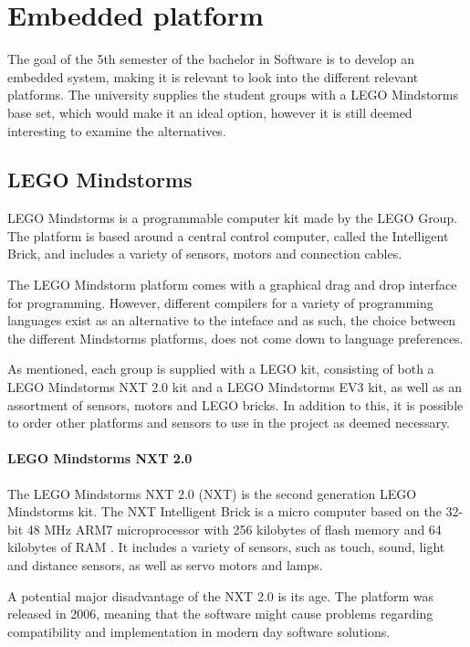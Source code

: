 

\section{Embedded platform}
The goal of the 5th semester of the bachelor in Software is to develop an embedded system, making it is relevant to look into the different relevant platforms.
The university supplies the student groups with a LEGO Mindstorms base set, which would make it an ideal option, however it is still deemed interesting to examine the alternatives.

\subsection{LEGO Mindstorms}
LEGO Mindstorms is a programmable computer kit made by the LEGO Group.
The platform is based around a central control computer, called the Intelligent Brick, and includes a variety of sensors, motors and connection cables.

The LEGO Mindstorm platform comes with a graphical drag and drop interface for programming.
However, different compilers for a variety of programming languages exist as an alternative to the inteface and as such, the choice between the different Mindstorms platforms, does not come down to language preferences.

As mentioned, each group is supplied with a LEGO kit, consisting of both a LEGO Mindstorms NXT 2.0 kit and a LEGO Mindstorms EV3 kit, as well as an assortment of sensors, motors and LEGO bricks.
In addition to this, it is possible to order other platforms and sensors to use in the project as deemed necessary.

\paragraph{LEGO Mindstorms NXT 2.0}
The LEGO Mindstorms NXT 2.0 (NXT) is the second generation LEGO Mindstorms kit.
The NXT Intelligent Brick is a micro computer based on the 32-bit 48 MHz ARM7 microprocessor with 256 kilobytes of flash memory and 64 kilobytes of RAM \cite{nxt2userguide} \cite{nxt2ev3compare}.
It includes a variety of sensors, such as touch, sound, light and distance sensors, as well as servo motors and lamps.

A potential major disadvantage of the NXT 2.0 is its age.
The platform was released in 2006, meaning that the software might cause problems regarding compatibility and implementation in modern day software solutions.


